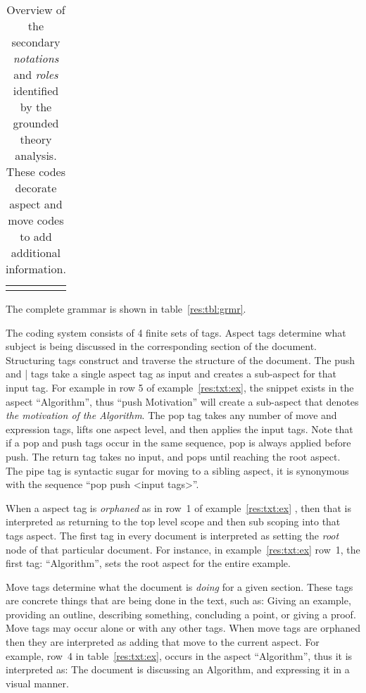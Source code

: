 \documentclass[sigconf]{acmart}
\begin{document}
\begin{table}
\begin{tabular}{ll}

\\[-1.5ex]

\\[-1.5ex]
\end{tabular}
\caption{Overview of the secondary \emph{notations} and \emph{roles} identified
by the grounded theory analysis. These codes decorate aspect and move codes to
add additional information.}
\label{tbl:codes:dec}
\end{table}

The complete grammar is shown in table~\ref{res:tbl:grmr}.



The coding system consists of 4 finite sets of tags. Aspect tags determine what
subject is being discussed in the corresponding section of the document.
%
Structuring tags construct and traverse the structure of the document. The
push and | tags take a single aspect tag as input and creates a sub-aspect
for that input tag. For example in row 5 of example~\ref{res:txt:ex}, the
snippet exists in the aspect ``Algorithm'', thus ``push Motivation'' will
create a sub-aspect that denotes \emph{the motivation of the Algorithm}.
%
The pop tag takes any number of move and expression tags, lifts one aspect
level, and then applies the input tags. Note that if a pop and push tags occur
in the same sequence, pop is always applied before push. The return tag takes no
input, and pops until reaching the root aspect. The pipe tag is syntactic sugar
for moving to a sibling aspect, it is synonymous with the sequence ``pop push
<input tags>''.


When a aspect tag is \emph{orphaned} as in row~1 of example~\ref{res:txt:ex}
, then that is interpreted as returning to the
top level scope and then sub scoping into that tags aspect. The first tag in
every document is interpreted as setting the \emph{root} node of that particular
document. For instance, in example~\ref{res:txt:ex} row~1, the first tag:
``Algorithm'', sets the root aspect for the entire example.

Move tags determine what the document is \emph{doing} for a given section.
These tags are concrete things that are being done in the text, such as: Giving
an example, providing an outline, describing something, concluding a point, or
giving a proof. Move tags may occur alone or with any other tags. When move
tags are orphaned then they are interpreted as adding that move to the current
aspect. For example, row~4 in table~\ref{res:txt:ex}, occurs in the
aspect ``Algorithm'', thus it is interpreted as: The document is discussing
an Algorithm, and expressing it in a visual manner.
\end{document}
